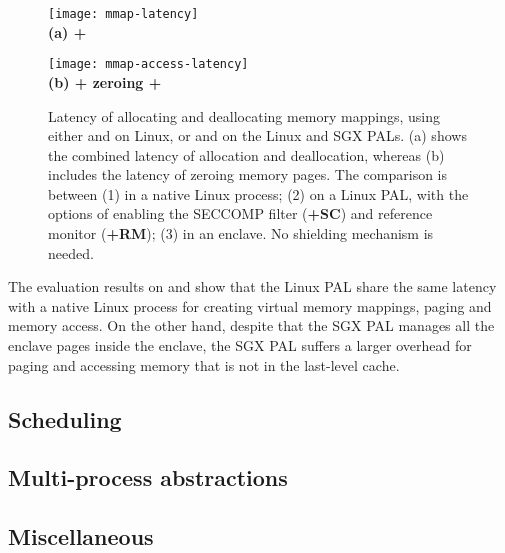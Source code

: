 \begin{figure*}[t!]
\centering
\footnotesize
\begin{minipage}{.49\linewidth}
\centering
\texttt{[image: mmap-latency]}\\
{\bf (a)  + }
\vspace{6pt}
\end{minipage}
\begin{minipage}{.49\linewidth}
\centering
\texttt{[image: mmap-access-latency]}\\
{\bf (b)  + zeroing + }
\vspace{6pt}
\end{minipage}
\caption{Latency of allocating and deallocating memory mappings, using either  and  on Linux, or  and  on the Linux and SGX PALs.
(a) shows the combined latency of allocation and deallocation, whereas (b) includes the latency of zeroing memory pages.
The comparison is between (1) \linuxapis{} in a native Linux process; (2) \hostapis{} on a Linux PAL, with the options of enabling the SECCOMP filter ({\bf +SC}) and reference monitor ({\bf +RM}); (3) \hostapis{} in an enclave. No shielding mechanism is needed.}
\label{fig:eval:pal:mmap-latency}
\end{figure*}

The evaluation results on  and 
show that the Linux PAL share the same latency
with a native Linux process
for creating virtual memory mappings, paging and memory access.
On the other hand, despite that the SGX PAL manages all the enclave pages
inside the enclave,
the SGX PAL suffers a larger overhead for paging and accessing memory that is not in the last-level cache.



\subsection{Scheduling}
















\subsection{Multi-process abstractions}













\subsection{Miscellaneous}

